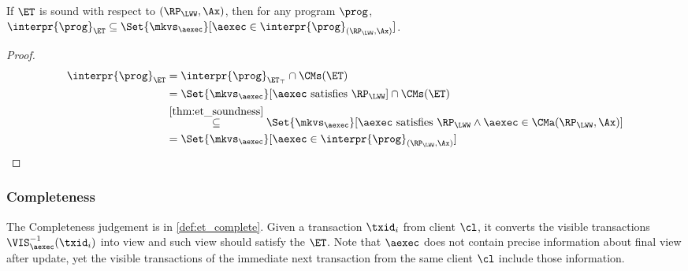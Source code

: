\begin{corollary}
\label{cor:et-soundness}
If \(\ET\) is sound with respect to \((\RP_{\LWW}, \Ax)\), then 
for any program \(\prog\), \(\interpr{\prog}_{\ET} \subseteq \Set{ \mkvs_{\aexec} }[ \aexec \in \interpr{\prog}_{(\RP_{\LWW}, \Ax)} ]\).
\end{corollary}
\begin{proof}
\begin{align*}
\interpr{\prog}_{\ET} 
& \stackrel{%
}{=} 
\interpr{\prog}_{\ET_\top} \cap \CMs(\ET) \\
& \stackrel{%
}{=} 
\Set{\mkvs_{\aexec} }[ \aexec \text{ satisfies } \RP_{\LWW}] \cap \CMs(\ET) \\
& \stackrel{\cref{thm:et_soundness}}{\subseteq} 
\Set{\mkvs_{\aexec} }[ \aexec \text{ satisfies } \RP_{\LWW} \land \aexec \in \CMa(\RP_{\LWW}, \Ax) ] \\
& \stackrel{%
}{=}
\Set{ \mkvs_{\aexec} }[ \aexec \in \interpr{\prog}_{(\RP_{\LWW}, \Ax)} ]
\end{align*}
\end{proof}

\subsubsection{Completeness}
The Completeness judgement is in \cref{def:et_complete}.
Given a transaction \( \txid_i \) from client \( \cl \), it converts the visible transactions \( \VIS_{\aexec}^{-1}(\txid_{i}) \) into view  and such view should satisfy the \( \ET \).
Note that \( \aexec \) does not contain precise information about final view after update,
yet the visible transactions of the immediate next transaction from the same client \( \cl \) include those information.

